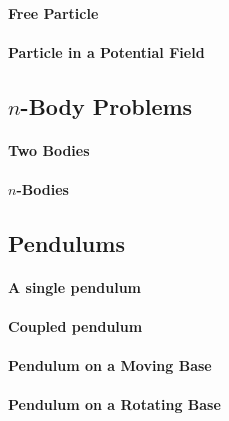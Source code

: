 \documentclass[preprint]{sigplanconf}
\newcommand{\sepbar}{\mathrel|}
\theoremstyle{examplestyle}
\begin{document}

\paragraph{Free Particle}

\paragraph{Particle in a Potential Field}

\subsection{$n$-Body Problems}

\paragraph{Two Bodies}

\paragraph{$n$-Bodies}

\subsection{Pendulums}

\paragraph{A single pendulum}

\paragraph{Coupled pendulum}

\paragraph{Pendulum on a Moving Base}

\paragraph{Pendulum on a Rotating Base}
\end{document}

